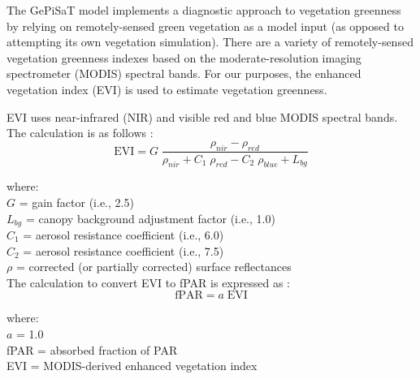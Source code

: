 The GePiSaT model implements a diagnostic approach to vegetation greenness by relying on remotely-sensed green vegetation as a model input (as opposed to attempting its own vegetation simulation).  
There are a variety of remotely-sensed vegetation greenness indexes based on the moderate-resolution imaging spectrometer (MODIS) spectral bands.
For our purposes, the enhanced vegetation index (EVI) is used to estimate vegetation greenness.

EVI uses near-infrared (NIR) and visible red and blue MODIS spectral bands.  
The calculation is as follows \parencite[Eq. 2]{huete02}:
\begin{equation}
\label{eq:evi}
    \text{EVI} = G\; \frac{\rho_{nir} - \rho_{red}}{\rho_{nir} + 
                 C_{1}\; \rho_{red} - C_{2}\; \rho_{blue} + L_{bg}}
\end{equation}

\noindent where:\\
\indent $G$ = gain factor (i.e., 2.5)\\
\indent $L_{bg}$ = canopy background adjustment factor (i.e., 1.0)\\
\indent $C_{1}$ = aerosol resistance coefficient (i.e., 6.0)\\
\indent $C_{2}$ = aerosol resistance coefficient (i.e., 7.5)\\
\indent $\rho$ = corrected (or partially corrected) surface reflectances\\

\noindent The calculation to convert EVI to fPAR is expressed as \parencite[Eq. 11]{xiao05}:
%
\begin{equation}
\label{eq:fapar}
    \text{fPAR} = a\; \text{EVI}
\end{equation}

\noindent where: \\
\indent $a$ = 1.0 \\
\indent fPAR = absorbed fraction of PAR\\
\indent EVI = MODIS-derived enhanced vegetation index \\

